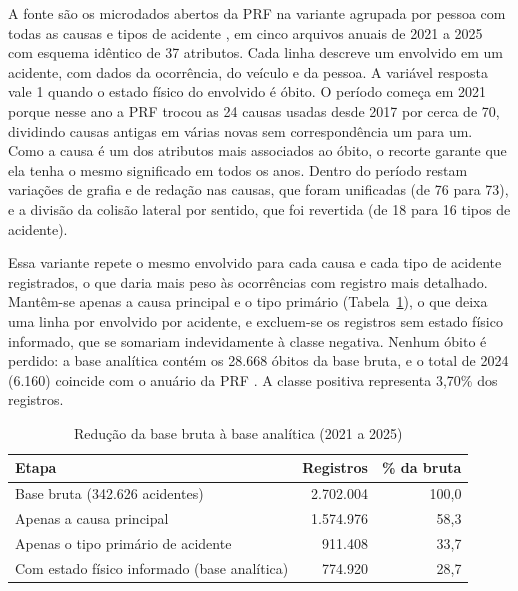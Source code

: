 \documentclass[12pt]{article}
\begin{document}
A fonte são os microdados abertos da PRF na variante agrupada por pessoa
com todas as causas e tipos de acidente \cite{prfdados}, em cinco
arquivos anuais de 2021 a 2025 com esquema idêntico de 37 atributos. Cada
linha descreve um envolvido em um acidente, com dados da ocorrência, do
veículo e da pessoa. A variável resposta vale 1 quando o estado físico do
envolvido é óbito. O período começa em 2021 porque nesse ano a PRF
trocou as 24 causas usadas desde 2017 por cerca de 70, dividindo causas
antigas em várias novas sem correspondência um para um. Como a causa é
um dos atributos mais associados ao óbito, o recorte garante que ela
tenha o mesmo significado em todos os anos. Dentro do período restam variações de
grafia e de redação nas causas, que foram unificadas (de 76 para 73), e
a divisão da colisão lateral por sentido, que foi revertida (de 18 para
16 tipos de acidente).

Essa variante repete o mesmo envolvido para cada causa e cada tipo de
acidente registrados, o que daria mais peso às ocorrências com registro
mais detalhado. Mantêm-se apenas a causa principal e o tipo primário
(Tabela~\ref{tab:funil}), o que deixa uma linha por envolvido por acidente, e
excluem-se os registros sem estado físico informado, que se somariam
indevidamente à classe negativa. Nenhum óbito é perdido: a base
analítica contém os 28.668 óbitos da base bruta, e o total de 2024
(6.160) coincide com o anuário da PRF \cite{prf2024}. A classe positiva
representa 3,70\% dos registros.

\begin{table}[tb]
\centering
\caption{Redução da base bruta à base analítica (2021 a 2025)}
\label{tab:funil}
\small
\begin{tabular}{lrr}
\toprule
Etapa & Registros & \% da bruta \\
\midrule
Base bruta (342.626 acidentes) & 2.702.004 & 100,0 \\
Apenas a causa principal & 1.574.976 & 58,3 \\
Apenas o tipo primário de acidente & 911.408 & 33,7 \\
Com estado físico informado (base analítica) & 774.920 & 28,7 \\
\bottomrule
\end{tabular}
\end{table}
\end{document}
